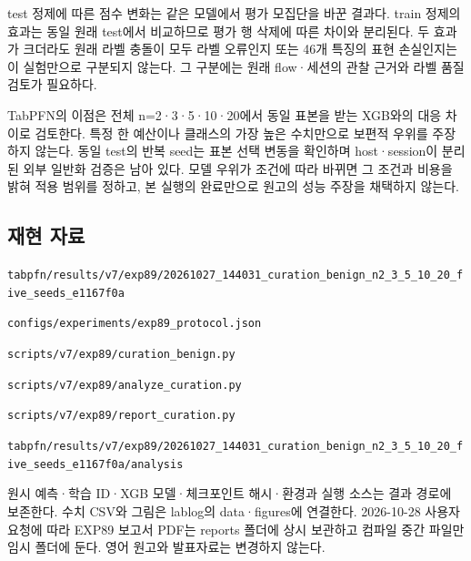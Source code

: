 test 정제에 따른 점수 변화는 같은 모델에서 평가 모집단을 바꾼 결과다. train 정제의 효과는 동일 원래 test에서 비교하므로 평가 행 삭제에 따른 차이와 분리된다. 두 효과가 크더라도 원래 라벨 충돌이 모두 라벨 오류인지 또는 46개 특징의 표현 손실인지는 이 실험만으로 구분되지 않는다. 그 구분에는 원래 flow·세션의 관찰 근거와 라벨 품질 검토가 필요하다.

TabPFN의 이점은 전체 n=\allowbreak{}2·3·5·10·20에서 동일 표본을 받는 XGB와의 대응 차이로 검토한다. 특정 한 예산이나 클래스의 가장 높은 수치만으로 보편적 우위를 주장하지 않는다. 동일 test의 반복 seed는 표본 선택 변동을 확인하며 host·session이 분리된 외부 일반화 검증은 남아 있다. 모델 우위가 조건에 따라 바뀌면 그 조건과 비용을 밝혀 적용 범위를 정하고, 본 실행의 완료만으로 원고의 성능 주장을 채택하지 않는다.

\subsection{재현 자료}
\texttt{tabpfn/\allowbreak{}\allowbreak{}r\allowbreak{}esults/\allowbreak{}\allowbreak{}v\allowbreak{}7/\allowbreak{}\allowbreak{}exp89/\allowbreak{}\allowbreak{}20261027\allowbreak{}\_\allowbreak{}\allowbreak{}144031\_\allowbreak{}\allowbreak{}curation\allowbreak{}\_\allowbreak{}\allowbreak{}benign\_\allowbreak{}\allowbreak{}n2\_\allowbreak{}\allowbreak{}3\_\allowbreak{}\allowbreak{}5\_\allowbreak{}\allowbreak{}1\allowbreak{}0\_\allowbreak{}\allowbreak{}20\_\allowbreak{}\allowbreak{}fiv\allowbreak{}e\_\allowbreak{}\allowbreak{}seeds\_\allowbreak{}\allowbreak{}e1167f0a\allowbreak{}}

\texttt{configs/\allowbreak{}\allowbreak{}experime\allowbreak{}nts/\allowbreak{}\allowbreak{}exp8\allowbreak{}9\_\allowbreak{}\allowbreak{}protoc\allowbreak{}ol.\allowbreak{}json}

\texttt{scripts/\allowbreak{}\allowbreak{}v7/\allowbreak{}\allowbreak{}exp89\allowbreak{}/\allowbreak{}\allowbreak{}curatio\allowbreak{}n\_\allowbreak{}\allowbreak{}benign\allowbreak{}.\allowbreak{}py}

\texttt{scripts/\allowbreak{}\allowbreak{}v7/\allowbreak{}\allowbreak{}exp89\allowbreak{}/\allowbreak{}\allowbreak{}analyze\allowbreak{}\_\allowbreak{}\allowbreak{}curatio\allowbreak{}n.\allowbreak{}py}

\texttt{scripts/\allowbreak{}\allowbreak{}v7/\allowbreak{}\allowbreak{}exp89\allowbreak{}/\allowbreak{}\allowbreak{}report\_\allowbreak{}\allowbreak{}curation\allowbreak{}.\allowbreak{}py}

\texttt{tabpfn/\allowbreak{}\allowbreak{}r\allowbreak{}esults/\allowbreak{}\allowbreak{}v\allowbreak{}7/\allowbreak{}\allowbreak{}exp89/\allowbreak{}\allowbreak{}20261027\allowbreak{}\_\allowbreak{}\allowbreak{}144031\_\allowbreak{}\allowbreak{}curation\allowbreak{}\_\allowbreak{}\allowbreak{}benign\_\allowbreak{}\allowbreak{}n2\_\allowbreak{}\allowbreak{}3\_\allowbreak{}\allowbreak{}5\_\allowbreak{}\allowbreak{}1\allowbreak{}0\_\allowbreak{}\allowbreak{}20\_\allowbreak{}\allowbreak{}fiv\allowbreak{}e\_\allowbreak{}\allowbreak{}seeds\_\allowbreak{}\allowbreak{}e1167f0a\allowbreak{}/\allowbreak{}\allowbreak{}analysi\allowbreak{}s}

원시 예측·학습 ID·XGB 모델·체크포인트 해시·환경과 실행 소스는 결과 경로에 보존한다. 수치 CSV와 그림은 lablog의 data·figures에 연결한다. 2026-10-28 사용자 요청에 따라 EXP89 보고서 PDF는 reports 폴더에 상시 보관하고 컴파일 중간 파일만 임시 폴더에 둔다. 영어 원고와 발표자료는 변경하지 않는다.



